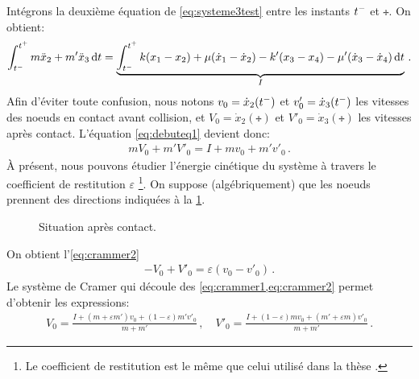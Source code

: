 \noindent Intégrons la deuxième équation de \ref{eq:systeme3test} entre les instants $t^{-}$ et $\tplus$. On obtient:
\begin{align}    \label{eq:debuteq1}
    \int_{\tmoins}^{\tplus} m\ddot x_2 + m'\ddot x_3 \diff t = \underbrace{\int_{\tmoins}^{\tplus} k(x_1 - x_2) + \mu (\dot x_1 - \dot x_2) - k'(x_3 - x_4) - \mu'(\dot x_3 - \dot x_4) \diff t}_{I} \,.
\end{align}
Afin d'éviter toute confusion, nous notons $v_0 = \dot{x}_2(t^{-})$ et $v'_0 = \dot{x}_3(t^{-})$ les vitesses des noeuds en contact avant collision, et $V_0 = \dot{x}_2(\tplus)$ et $V'_0 = \dot{x}_3(\tplus)$ les vitesses après contact. L'équation \cref{eq:debuteq1} devient donc:
\begin{align} \label{eq:crammer1}
    mV_0 + m'V'_0 = I + mv_0 + m'v'_0 \,.
\end{align}
À présent, nous pouvons étudier l'énergie cinétique du système à travers le coefficient de restitution $\varepsilon$ \footnote{Le coefficient de restitution est le même que celui utilisé dans la thèse \parencite{rabatel2015thesis}.}. On suppose (algébriquement) que les noeuds prennent des directions indiquées à la \cref{fig:contact1dapres}. 
\begin{figure}[!h]
    \centering
    \caption{Situation après contact.}
    \label{fig:contact1dapres}
\end{figure}

\noindent On obtient l'\cref{eq:crammer2}
\begin{align} \label{eq:crammer2}
    - V_0 + V'_0 = \varepsilon (v_0 - v'_0) \,.
\end{align}
Le système de Cramer qui découle des \cref{eq:crammer1,eq:crammer2} permet d'obtenir les expressions:
\begin{align}
    V_0 = \frac{I + (m+\varepsilon m')v_0 + (1-\varepsilon)m'v'_0}{m+m'} \,, \quad V'_0 = \frac{I + (1-\varepsilon)mv_0 + (m'+\varepsilon m)v'_0}{m+m'} \,.
\end{align}





























